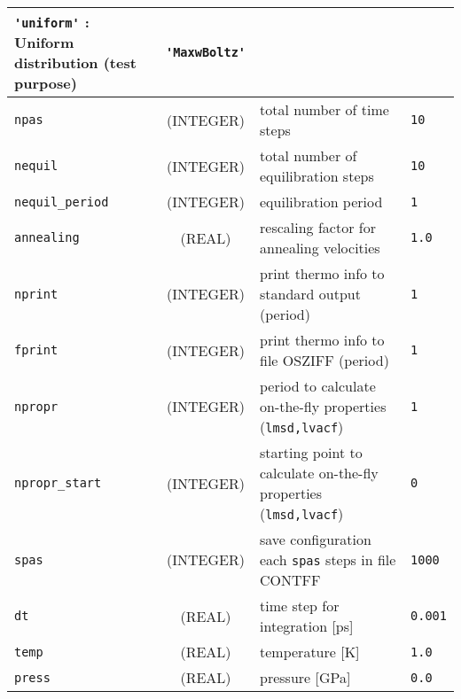 \documentclass[a4paper]{article}
\begin{document}
\begin{longtable}{l|c|m{8cm}|m{2cm}}
					 \verb?'uniform'?   : Uniform distribution (test purpose) \newline                  & \verb?'MaxwBoltz'? \tabularnewline
\hline
\rule[-0.75cm]{0cm}{1.5cm}
\verb?npas?      & (INTEGER)          &  total number of time steps                                                         & \verb?10?    \\
\hline
\rule[-0.75cm]{0cm}{1.5cm}
\verb?nequil?    & (INTEGER)          &  total number of equilibration steps                                                & \verb?10? \\
\hline
\rule[-0.75cm]{0cm}{1.5cm}
\verb?nequil_period? 
                 & (INTEGER)          &  equilibration period                                                               & \verb?1? \\
\hline
\rule[-0.75cm]{0cm}{1.5cm}
\verb?annealing? & (REAL)             &  rescaling factor for annealing velocities                                          & \verb?1.0? \\
\hline
\rule[-0.75cm]{0cm}{1.5cm}
\verb?nprint?    & (INTEGER)          &  print thermo info to standard output (period)                                      & \verb?1? \\
\hline
\rule[-0.75cm]{0cm}{1.5cm}
\verb?fprint?    & (INTEGER)          &  print thermo info to file OSZIFF (period)                                          & \verb?1? \\
\hline
\rule[-0.75cm]{0cm}{1.5cm}
\verb?npropr?    & (INTEGER)          &  period to calculate on-the-fly properties (\verb?lmsd,lvacf?)                      & \verb?1? \\
\hline
\rule[-0.75cm]{0cm}{1.5cm}
\verb?npropr_start?   
                 & (INTEGER)          &  starting point to calculate on-the-fly properties (\verb?lmsd,lvacf?)              & \verb?0? \\
\hline
\rule[-0.75cm]{0cm}{1.5cm}
\verb?spas?      & (INTEGER)          &  save configuration each \verb?spas? steps in file CONTFF                           & \verb?1000? \\
\hline
\rule[-0.75cm]{0cm}{1.5cm}
\verb?dt?        & (REAL)             &  time step for integration [ps]                                                     & \verb?0.001? \\
\hline
\rule[-0.75cm]{0cm}{1.5cm}
\verb?temp?      & (REAL)             &  temperature [K]                                                                    & \verb?1.0?\\
\hline
\rule[-0.75cm]{0cm}{1.5cm}
\verb?press?     & (REAL)             &  pressure [GPa]                                                                     & \verb?0.0?\\

\end{longtable}
\end{document}
